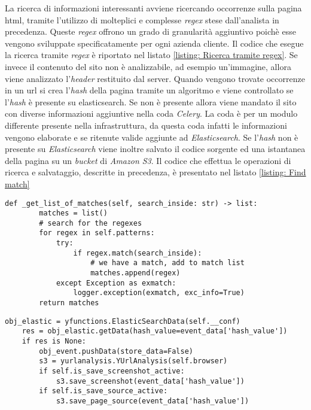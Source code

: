 La ricerca di informazioni interessanti avviene ricercando occorrenze sulla pagina html, tramite l’utilizzo di molteplici e complesse \emph{regex} stese dall’analista in precedenza. Queste \emph{regex} offrono un grado di granularità aggiuntivo poichè esse vengono sviluppate specificatamente per ogni azienda cliente. Il codice che esegue la ricerca tramite \emph{regex} è riportato nel listato \ref{listing: Ricerca tramite regex}. Se invece il contenuto del sito non è analizzabile, ad esempio un’immagine, allora viene analizzato l’\emph{header} restituito dal server. Quando vengono trovate occorrenze in un url si crea l’\emph{hash} della pagina tramite un algoritmo e viene controllato se l’\emph{hash} è presente su elasticsearch. Se non è presente allora viene mandato il sito con diverse informazioni aggiuntive nella coda \emph{Celery}. La coda è per un modulo differente presente nella infrastruttura, da questa coda infatti le informazioni vengono elaborate e se ritenute valide aggiunte ad \emph{Elasticsearch}. \newline{}
Se l’\emph{hash} non è presente su \emph{Elasticsearch} viene inoltre salvato il codice sorgente ed una istantanea della pagina su un \emph{bucket} di \emph{Amazon S3}. Il codice che effettua le operazioni di ricerca e salvataggio, descritte in precedenza, è presentato nel listato \ref{listing: Find match}

\begin{lstlisting}[caption=Ricerca tramite regex.,
	label=listing: Ricerca tramite regex]
    def _get_list_of_matches(self, search_inside: str) -> list:
        matches = list()
        # search for the regexes
        for regex in self.patterns:
            try:
                if regex.match(search_inside):
                    # we have a match, add to match list
                    matches.append(regex)
            except Exception as exmatch:
                logger.exception(exmatch, exc_info=True)
        return matches
\end{lstlisting}

\begin{lstlisting}[caption=Verifica della presenza delle informazioni su Elasticsearch ed opzionale aggiunta su Amazon S3 e ElasticSearch.,
	label=listing: Find match]
    obj_elastic = yfunctions.ElasticSearchData(self.__conf)
    res = obj_elastic.getData(hash_value=event_data['hash_value'])
    if res is None:
    	obj_event.pushData(store_data=False)
        s3 = yurlanalysis.YUrlAnalysis(self.browser)
        if self.is_save_screenshot_active:
        	s3.save_screenshot(event_data['hash_value'])
        if self.is_save_source_active:
			s3.save_page_source(event_data['hash_value'])
\end{lstlisting}
\newpage{}
